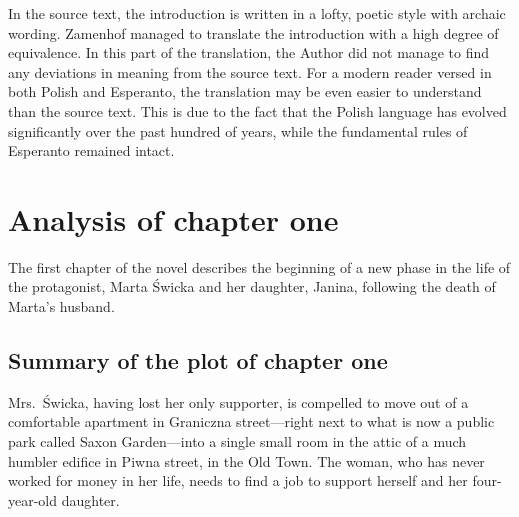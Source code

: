 In the source text, the introduction is written in a lofty, poetic style with archaic wording.
Zamenhof managed to translate the introduction with a high degree of equivalence.
In this part of the translation, the Author did not manage to find any deviations in meaning from the source text.
For a modern reader versed in both Polish and Esperanto, the translation may be even easier to understand than the source text.
This is due to the fact that the Polish language has evolved significantly over the past hundred of years, while the fundamental rules of Esperanto remained intact.




\section{Analysis of chapter one}

The first chapter of the novel describes the beginning of a new phase in the life of the protagonist, Marta Świcka and her daughter, Janina, following the death of Marta's husband.

\subsection{Summary of the plot of chapter one}
Mrs.\ Świcka, having lost her only supporter, is compelled to move out of a comfortable apartment in Graniczna street---right next to what is now a public park called Saxon Garden---into a single small room in the attic of a much humbler edifice in Piwna street, in the Old Town.
The woman, who has never worked for money in her life, needs to find a job to support herself and her four-year-old daughter.

